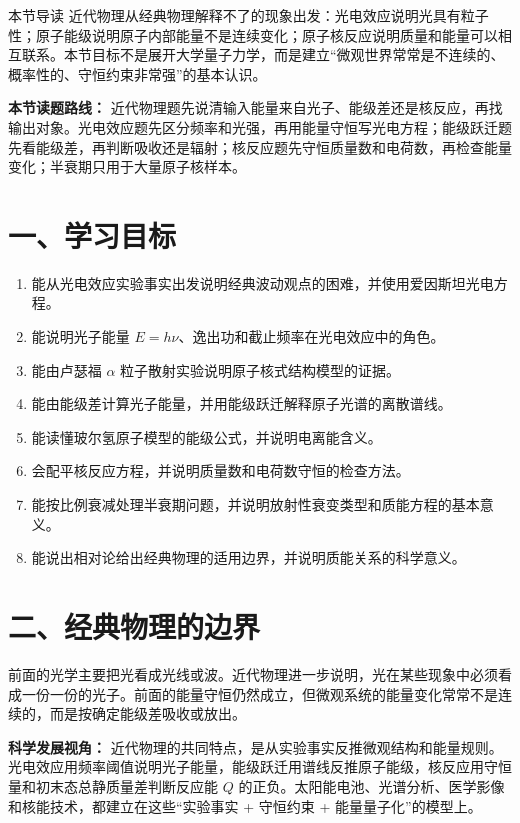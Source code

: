 
\begin{learningbox}{本节导读}
近代物理从经典物理解释不了的现象出发：光电效应说明光具有粒子性；原子能级说明原子内部能量不是连续变化；原子核反应说明质量和能量可以相互联系。本节目标不是展开大学量子力学，而是建立“微观世界常常是不连续的、概率性的、守恒约束非常强”的基本认识。
\end{learningbox}

\textbf{本节读题路线：} 近代物理题先说清输入能量来自光子、能级差还是核反应，再找输出对象。光电效应题先区分频率和光强，再用能量守恒写光电方程；能级跃迁题先看能级差，再判断吸收还是辐射；核反应题先守恒质量数和电荷数，再检查能量变化；半衰期只用于大量原子核样本。

\section*{一、学习目标}
\begin{enumerate}
  \item 能从光电效应实验事实出发说明经典波动观点的困难，并使用爱因斯坦光电方程。
  \item 能说明光子能量 $E=h\nu$、逸出功和截止频率在光电效应中的角色。
  \item 能由卢瑟福 $\alpha$ 粒子散射实验说明原子核式结构模型的证据。
  \item 能由能级差计算光子能量，并用能级跃迁解释原子光谱的离散谱线。
  \item 能读懂玻尔氢原子模型的能级公式，并说明电离能含义。
  \item 会配平核反应方程，并说明质量数和电荷数守恒的检查方法。
  \item 能按比例衰减处理半衰期问题，并说明放射性衰变类型和质能方程的基本意义。
  \item 能说出相对论给出经典物理的适用边界，并说明质能关系的科学意义。
\end{enumerate}
\section*{二、经典物理的边界}

前面的光学主要把光看成光线或波。近代物理进一步说明，光在某些现象中必须看成一份一份的光子。前面的能量守恒仍然成立，但微观系统的能量变化常常不是连续的，而是按确定能级差吸收或放出。

\textbf{科学发展视角：} 近代物理的共同特点，是从实验事实反推微观结构和能量规则。光电效应用频率阈值说明光子能量，能级跃迁用谱线反推原子能级，核反应用守恒量和初末态总静质量差判断反应能 $Q$ 的正负。太阳能电池、光谱分析、医学影像和核能技术，都建立在这些“实验事实 + 守恒约束 + 能量量子化”的模型上。

